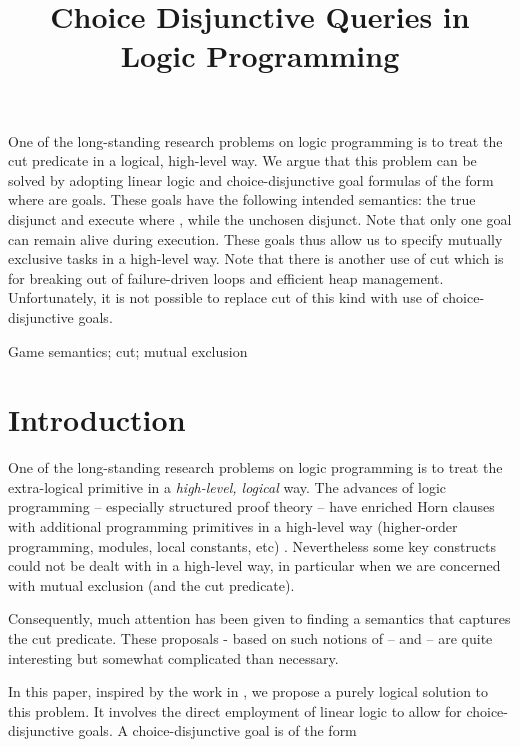 \documentclass[letter]{ieice}
\title{Choice Disjunctive Queries in Logic Programming}
\begin{document}
\maketitle
\begin{summary}
One of the long-standing research problems on logic programming is to treat the cut predicate
 in a logical, high-level way.
 We argue that this problem can be solved by adopting linear logic and 
   choice-disjunctive goal formulas of the form 
   where   are
goals.   These goals have the following intended semantics:
  the true disjunct  and execute  where , while 
 the unchosen disjunct.  
Note that only one goal can remain alive during execution. These goals thus allow us to specify
mutually exclusive tasks in a high-level way.   Note that there is another use of cut which is for breaking out of failure-driven loops and efficient heap management.
Unfortunately, it is not possible to replace cut of this kind with use of choice-disjunctive goals.
 

\end{summary}
\begin{keywords}
Game semantics; cut; mutual exclusion
\end{keywords}









\section{Introduction}

One of the long-standing research problems on logic programming is to treat the extra-logical 
primitive in a  {\it high-level, logical} way.
The advances of logic programming -- especially structured proof theory --  have enriched Horn clauses with
 additional programming primitives  in a  high-level way
 (higher-order programming, modules, local constants, etc) \cite{MNPS91,Kwon,Loke}.
 Nevertheless some key constructs could not be dealt with in a high-level way, in particular when we are
 concerned with  mutual exclusion (and  the 
cut
predicate). 

Consequently, much attention \cite{Por,Sau08,Kri11} has been given to finding a 
semantics that captures the cut predicate.
These proposals  - based on such  notions of -- and  -- are quite interesting but somewhat complicated
than necessary.
                                         

    In this paper, inspired by the work in \cite{Jap03,Jap08,JapCL1,JapCL2,JapCL12}, we propose a purely logical solution to this problem. It involves the direct employment of linear logic
\cite{Gir87}
 to allow for choice-disjunctive   goals.
 A  choice-disjunctive  goal  is of the form 
 
\end{document}
